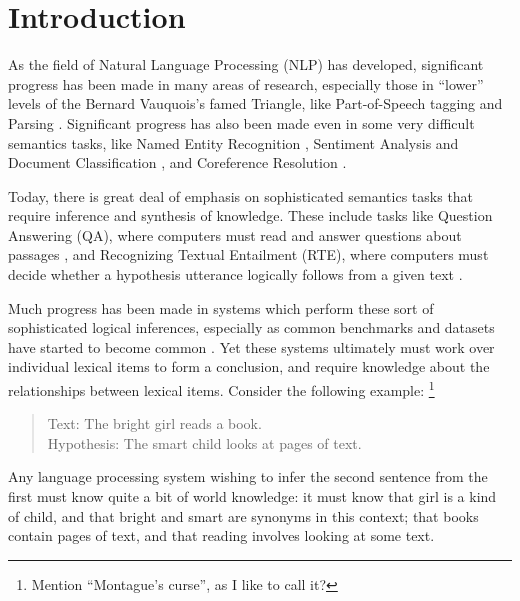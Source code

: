 \documentclass[12pt]{article}
\begin{document}
\tableofcontents
\pagebreak

\section{Introduction}
\label{sec:intro}

As the field of Natural Language Processing (NLP) has developed, significant
progress has been made in many areas of research, especially those in ``lower''
levels of the Bernard Vauquois's famed Triangle, like Part-of-Speech tagging
\cite{toutanova:2003:naacl} and Parsing \cite{chen:2014:emnlp}.  Significant progress
has also been made even in some very difficult semantics tasks,
like Named Entity Recognition \cite{needcite}, Sentiment Analysis
\cite{socher:2013:nips} and Document Classification \cite{zhang:2016:naacl},
and Coreference Resolution \cite{durrett:2013:emnlp}.

Today, there is great deal of emphasis on sophisticated semantics
tasks that require inference and synthesis of knowledge. These include tasks
like Question Answering (QA), where computers must read and answer questions
about passages \cite{hermann:2015:nips,needcite}, and Recognizing Textual
Entailment (RTE), where computers must decide whether a hypothesis utterance
logically follows from a given text
\cite{marelli:2014:semeval,bowman:2015:emnlp,beltagy:2016:cl}.

Much progress has been made in systems which perform these sort of sophisticated
logical inferences, especially as common benchmarks and datasets have started
to become common \cite{marelli:2014:semeval,bowman:2015:emnlp}. Yet these
systems ultimately must work over individual lexical items to form a
conclusion, and require knowledge about the relationships between lexical
items. Consider the following example:
\footnote{Mention ``Montague's curse'', as I like to call it?}
\begin{quote}
  Text: The bright girl reads a book.\\
  Hypothesis: The smart child looks at pages of text.
\end{quote}
Any language processing system wishing to infer the second sentence from
the first must know quite a bit of world knowledge: it must know that
girl is a kind of child, and that bright and smart are synonyms in this
context; that books contain pages of text, and that reading involves looking
at some text.
\end{document}
